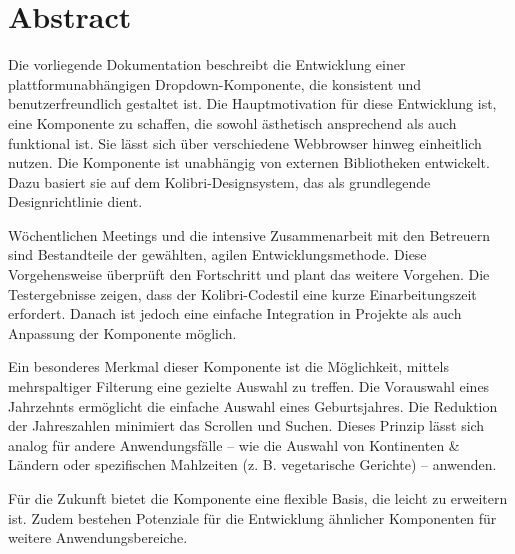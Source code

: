 \chapter*{Abstract}

Die vorliegende Dokumentation beschreibt die Entwicklung einer plattformunabhängigen Dropdown-Komponente, die konsistent und benutzerfreundlich gestaltet ist. 
Die Hauptmotivation für diese Entwicklung ist, eine Komponente zu schaffen, die sowohl ästhetisch ansprechend als auch funktional ist. 
Sie lässt sich über verschiedene Webbrowser hinweg einheitlich nutzen. 
Die Komponente ist unabhängig von externen Bibliotheken entwickelt. 
Dazu basiert sie auf dem Kolibri-Designsystem, das als grundlegende Designrichtlinie dient. 

Wöchentlichen Meetings und die intensive Zusammenarbeit mit den Betreuern sind Bestandteile der gewählten, agilen Entwicklungsmethode. 
Diese Vorgehensweise überprüft den Fortschritt und plant das weitere Vorgehen. 
Die Testergebnisse zeigen, dass der Kolibri-Codestil eine kurze Einarbeitungszeit erfordert. 
Danach ist jedoch eine einfache Integration in Projekte als auch Anpassung der Komponente möglich. 

Ein besonderes Merkmal dieser Komponente ist die Möglichkeit, mittels mehrspaltiger Filterung eine gezielte Auswahl zu treffen. 
Die Vorauswahl eines Jahrzehnts ermöglicht die einfache Auswahl eines Geburtsjahres. 
Die Reduktion der Jahreszahlen minimiert das Scrollen und Suchen. 
Dieses Prinzip lässt sich analog für andere Anwendungsfälle – wie die Auswahl von Kontinenten \& Ländern oder spezifischen Mahlzeiten (z. B. vegetarische Gerichte) – anwenden. 

Für die Zukunft bietet die Komponente eine flexible Basis, die leicht zu erweitern ist. 
Zudem bestehen Potenziale für die Entwicklung ähnlicher Komponenten für weitere Anwendungsbereiche. 
